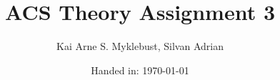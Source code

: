 \documentclass[12pt,a4paper]{article}
\begin{document}
\title{ACS Theory Assignment 3}
\subtitle{}

\author{Kai Arne S. Myklebust, Silvan Adrian}
\date{Handed in: \today}
	
\maketitle
\tableofcontents





\end{document}
